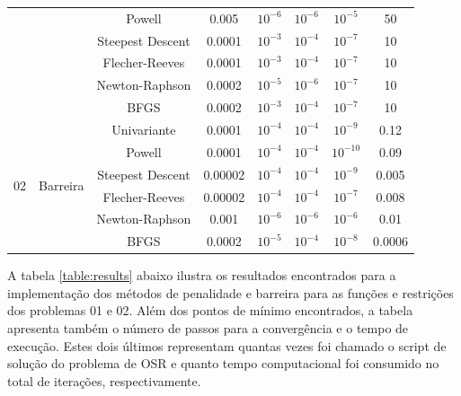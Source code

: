 \documentclass[10pt, a4paper]{article}
\begin{document}
\begin{table}[H]
\begin{tabular}{c|c|c|c|c|c|c|c}
                                                            & & Powell            & 0.005  & $10^{-6}$ & $10^{-6}$ & $10^{-5}$ & 50 \\
                                                            & & Steepest Descent  & 0.0001 & $10^{-3}$ & $10^{-4}$ & $10^{-7}$ & 10 \\
                                                            & & Flecher-Reeves    & 0.0001 & $10^{-3}$ & $10^{-4}$ & $10^{-7}$ & 10 \\
                                                            & & Newton-Raphson    & 0.0002 & $10^{-5}$ & $10^{-6}$ & $10^{-7}$ & 10 \\
                                                            & & BFGS              & 0.0002 & $10^{-3}$ & $10^{-4}$ & $10^{-7}$ & 10 \\
            \hline
            \multirow{6}{*}{02} & \multirow{6}{*}{Barreira} & Univariante         & 0.0001  & $10^{-4}$ & $10^{-4}$ & $10^{-9}$  & 0.12   \\
                                                            & & Powell            & 0.0001  & $10^{-4}$ & $10^{-4}$ & $10^{-10}$ & 0.09   \\
                                                            & & Steepest Descent  & 0.00002 & $10^{-4}$ & $10^{-4}$ & $10^{-9}$  & 0.005  \\
                                                            & & Flecher-Reeves    & 0.00002 & $10^{-4}$ & $10^{-4}$ & $10^{-7}$  & 0.008  \\
                                                            & & Newton-Raphson    & 0.001   & $10^{-6}$ & $10^{-6}$ & $10^{-6}$  & 0.01   \\
                                                            & & BFGS              & 0.0002  & $10^{-5}$ & $10^{-4}$ & $10^{-8}$  & 0.0006 \\
            \hline
      \end{tabular}
      \label{table:params}
\end{table}


A tabela \ref{table:results} abaixo ilustra os resultados encontrados para a implementa\c c\~ao dos m\'etodos de penalidade e barreira para as fun\c c\~oes e restri\c c\~oes dos problemas 01 e 02. Al\'em dos pontos de m\'inimo encontrados, a tabela apresenta tamb\'em o n\'umero de passos para a converg\^encia e o tempo de execu\c c\~ao. Estes dois \'ultimos representam quantas vezes foi chamado o script de solu\c c\~ao do problema de OSR e quanto tempo computacional foi consumido no total de itera\c c\~oes, respectivamente.
\end{document}
